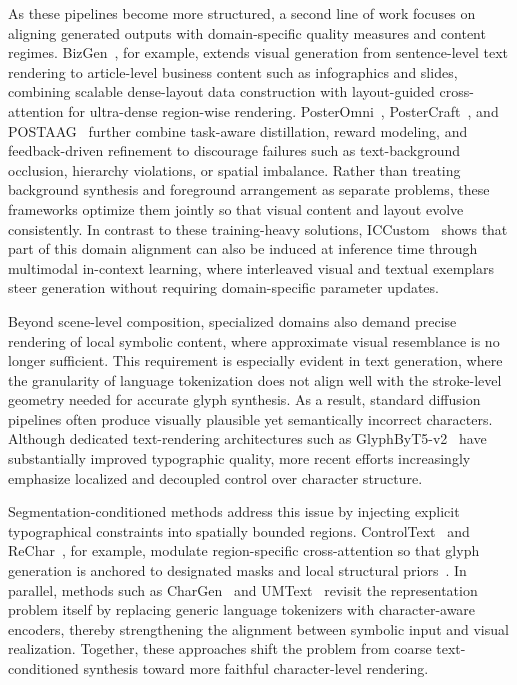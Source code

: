 As these pipelines become more structured, a second line of work focuses on aligning generated outputs with domain-specific quality measures and content regimes. BizGen~\citep{peng2025bizgen}, for example, extends visual generation from sentence-level text rendering to article-level business content such as infographics and slides, combining scalable dense-layout data construction with layout-guided cross-attention for ultra-dense region-wise rendering. PosterOmni~\citep{Chen2026PosterOmniGA}, PosterCraft~\citep{Chen2025PosterCraftRH}, and POSTAAG~\citep{Chen2025POSTAAG} further combine task-aware distillation, reward modeling, and feedback-driven refinement to discourage failures such as text-background occlusion, hierarchy violations, or spatial imbalance. Rather than treating background synthesis and foreground arrangement as separate problems, these frameworks optimize them jointly so that visual content and layout evolve consistently. In contrast to these training-heavy solutions, ICCustom~\citep{Li2025ICCustomDI} shows that part of this domain alignment can also be induced at inference time through multimodal in-context learning, where interleaved visual and textual exemplars steer generation without requiring domain-specific parameter updates.


Beyond scene-level composition, specialized domains also demand precise rendering of local symbolic content, where approximate visual resemblance is no longer sufficient. This requirement is especially evident in text generation, where the granularity of language tokenization does not align well with the stroke-level geometry needed for accurate glyph synthesis. As a result, standard diffusion pipelines often produce visually plausible yet semantically incorrect characters. Although dedicated text-rendering architectures such as GlyphByT5-v2~\citep{Liu2024GlyphByT5v2AS} have substantially improved typographic quality, more recent efforts increasingly emphasize localized and decoupled control over character structure.

Segmentation-conditioned methods address this issue by injecting explicit typographical constraints into spatially bounded regions. ControlText~\citep{Jiang2025ControlTextUC} and ReChar~\citep{Rechar}, for example, modulate region-specific cross-attention so that glyph generation is anchored to designated masks and local structural priors~\citep{Lu2025EasyTextCD, PaCaNet}. In parallel, methods such as CharGen~\citep{Ma2024CharGenHA} and UMText~\citep{Ma2026UMTextAU} revisit the representation problem itself by replacing generic language tokenizers with character-aware encoders, thereby strengthening the alignment between symbolic input and visual realization. Together, these approaches shift the problem from coarse text-conditioned synthesis toward more faithful character-level rendering.

